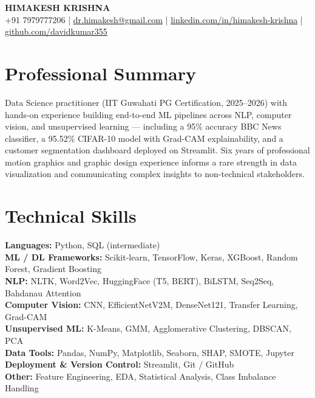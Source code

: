\documentclass[11pt, a4paper]{article}
\begin{document}
\begin{center}
  {\LARGE \textbf{HIMAKESH KRISHNA}} \\[4pt]
  +91 7979777206 \quad|\quad
  \href{mailto:dr.himakesh@gmail.com}{dr.himakesh@gmail.com} \quad|\quad
  \href{https://www.linkedin.com/in/himakesh-krishna}{linkedin.com/in/himakesh-krishna} \quad|\quad
  \href{https://github.com/davidkumar355}{github.com/davidkumar355}
\end{center}

\vspace{4pt}

\section{Professional Summary}

Data Science practitioner (IIT Guwahati PG Certification, 2025--2026) with hands-on experience building end-to-end ML pipelines across NLP, computer vision, and unsupervised learning --- including a 95\% accuracy BBC News classifier, a 95.52\% CIFAR-10 model with Grad-CAM explainability, and a customer segmentation dashboard deployed on Streamlit. Six years of professional motion graphics and graphic design experience informs a rare strength in data visualization and communicating complex insights to non-technical stakeholders.

\vspace{2pt}

\section{Technical Skills}

\textbf{Languages:} Python, SQL (intermediate) \\
\textbf{ML / DL Frameworks:} Scikit-learn, TensorFlow, Keras, XGBoost, Random Forest, Gradient Boosting \\
\textbf{NLP:} NLTK, Word2Vec, HuggingFace (T5, BERT), BiLSTM, Seq2Seq, Bahdanau Attention \\
\textbf{Computer Vision:} CNN, EfficientNetV2M, DenseNet121, Transfer Learning, Grad-CAM \\
\textbf{Unsupervised ML:} K-Means, GMM, Agglomerative Clustering, DBSCAN, PCA \\
\textbf{Data Tools:} Pandas, NumPy, Matplotlib, Seaborn, SHAP, SMOTE, Jupyter \\
\textbf{Deployment \& Version Control:} Streamlit, Git / GitHub \\
\textbf{Other:} Feature Engineering, EDA, Statistical Analysis, Class Imbalance Handling
\end{document}

